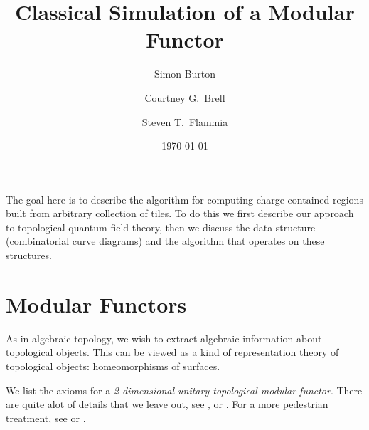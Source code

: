 \documentclass[aps, prl, letterpaper, twocolumn, superscriptaddress, notitlepage, 10pt]{revtex4-1}
\begin{document}
\title{Classical Simulation of a Modular Functor}

\author{Simon Burton}
\author{Courtney G.\ Brell}
\author{Steven T.\ Flammia}

\date{\today}

\maketitle


\onecolumngrid
\appendix



The goal here is to describe the algorithm for
computing charge contained regions built from 
arbitrary collection of tiles.
To do this we first describe our approach
to topological quantum field theory,
then we discuss the data structure 
(combinatorial curve diagrams) and the algorithm
that operates on these structures.


%
%

\section{Modular Functors}

As in algebraic topology, we wish to extract
algebraic information about topological objects.
This can be viewed as a kind of representation theory
of topological objects: homeomorphisms of surfaces.

We list the axioms for a 
\emph{2-dimensional unitary topological modular functor}.
There are quite alot of details that we leave out,
see
\cite{Turaev1994}, \cite{Walker1991} or \cite{Bakalov2000}.
For a more pedestrian treatment, see \cite{Freedman2002simulation} or \cite{Beverland2014}.
\end{document}
